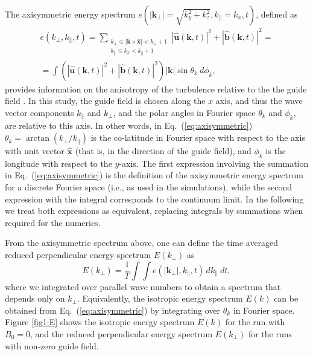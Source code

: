 \documentclass[aip,pop,reprint,amsmath,amssymb,floatfix]{revtex4-1}
\let\oldhat\hat
\renewcommand{\vec}[1]{\mathbf{#1}}
\renewcommand{\hat}[1]{\oldhat{\mathbf{#1}}}
\begin{document}
The axisymmetric energy spectrum $e(|\vec{k_\perp}| =
\sqrt{k_y^2+k_z^2}, k_\parallel = k_x, t)$, defined as
\begin{equation}\label{eq:axisymmetric}
\begin{split}  e(k_\perp, k_\parallel, t) = \sum_{\substack{k_\perp \leq |\vec{k}\times\hat{x}| < k_\perp+1 \\ k_\parallel \leq k_x < k_\parallel +1}} |\hat{u}(\vec{k},t)|^2 +|\hat{b}(\vec{k},t)|^2 = \\ = \int \left(|\hat{u}(\vec{k},t)|^2 +|\hat{b}(\vec{k},t)|^2\right) |\vec{k}| \sin \theta_k~d\phi_k,
\end{split}
\end{equation}
provides information on the anisotropy of the turbulence
relative to the the guide field \cite{mininni_isotropization_2012}. In
this study, the guide field is chosen along the $x$ axis, and thus the
wave vector components $k_\parallel$ and $k_\perp$, and the polar
angles in Fourier space $\theta_k$ and $\phi_k$, are relative to
this axis. In other words, in Eq.~(\ref{eq:axisymmetric}) 
$\theta_k = \arctan(k_\perp/k_\parallel)$ is the co-latitude in
Fourier space with respect to the axis with unit vector
$\hat{x}$ (that is, in the direction of the guide field), and
$\phi_k$ is the longitude with respect to the $y$-axis. The first
expression involving the summation in Eq.~(\ref{eq:axisymmetric}) is
the definition of the axisymmetric energy spectrum for a discrete
Fourier space (i.e., as used in the simulations), while the second
expression with the integral corresponds to the continuum limit. In
the following we treat both expressions as equivalent, replacing
integrals by summations when required for the numerics.

From the axisymmetric spectrum above, one can define the time averaged
reduced perpendicular energy spectrum $E(k_\perp)$
\cite{mininni_isotropization_2012} as
\begin{equation}\label{eq:reducedspectrum}
  E\left(k_\perp\right) = \frac{1}{T}\int\int e(|\vec{k_\perp}|,
  k_\parallel, t) \, dk_\parallel~dt,
\end{equation}
where we integrated over parallel wave numbers to obtain a spectrum
that depends only on $k_\perp$. Equivalently, the isotropic energy
spectrum $E(k)$ can be obtained from Eq.~(\ref{eq:axisymmetric}) by
integrating over $\theta_k$ in Fourier space. Figure \ref{fig1:E}
shows the isotropic energy spectrum $E(k)$ for the run with $B_0=0$,
and the reduced perpendicular energy spectrum $E(k_\perp)$ for the runs
with non-zero guide field.
\end{document}
